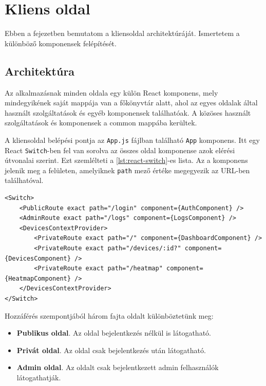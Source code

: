 \chapter{Kliens oldal}
\label{chapt:birdmap-frontend}
Ebben a fejezetben bemutatom a kliensoldal architektúráját. Ismertetem a különböző komponensek felépítését.

\section{Architektúra}
Az alkalmazásnak minden oldala egy külön React komponens, mely mindegyikének saját mappája van a főkönyvtár alatt, 
ahol az egyes oldalak által használt szolgáltatások és egyéb komponensek találhatóak.
A közöses használt szolgáltatások és komponensek a common mappába kerültek.

A kliensoldal belépési pontja az \verb+App.js+ fájlban található \verb+App+ komponens.
Itt egy React \verb+Switch+-ben fel van sorolva az összes oldal komponense azok elérési útvonalai szerint.
Ezt szemlélteti a \ref{lst:react-switch}-es lista.
Az a komponens jelenik meg a felületen, amelyiknek \verb+path+ mező értéke megegyezik az URL-ben találhatóval.

\begin{lstlisting}[style=jsx, caption=Az App.js Switch tartalma., label=lst:react-switch]
<Switch>
    <PublicRoute exact path="/login" component={AuthComponent} />
    <AdminRoute exact path="/logs" component={LogsComponent} />
    <DevicesContextProvider>
        <PrivateRoute exact path="/" component={DashboardComponent} />
        <PrivateRoute exact path="/devices/:id?" component={DevicesComponent} />
        <PrivateRoute exact path="/heatmap" component={HeatmapComponent} />
    </DevicesContextProvider>
</Switch>
\end{lstlisting}

Hozzáférés szempontjából három fajta oldalt különböztetünk meg:
\begin{itemize}
    \item \textbf{Publikus oldal}. Az oldal bejelentkezés nélkül is látogatható.
    \item \textbf{Privát oldal}. Az oldal csak bejelentkezés után látogatható.
    \item \textbf{Admin oldal}. Az oldalt csak bejelentkezett admin felhasználók látogathatják.
\end{itemize}

